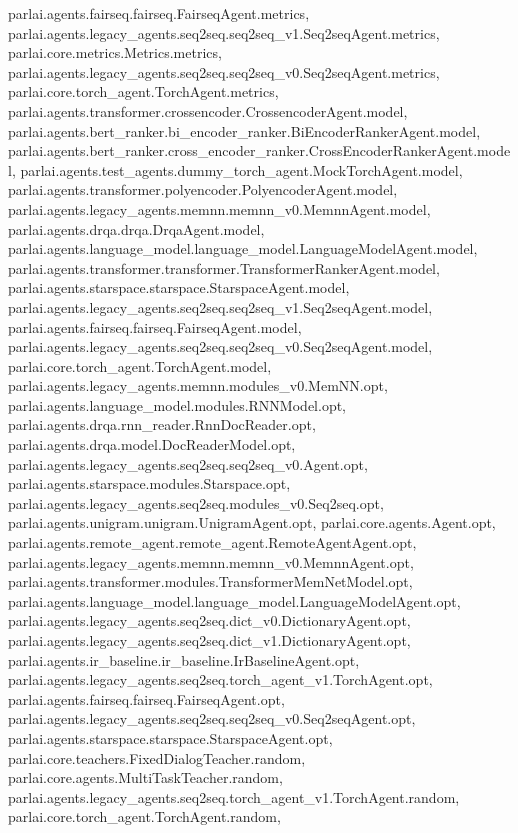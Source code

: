 parlai.\+agents.\+fairseq.\+fairseq.\+Fairseq\+Agent.\+metrics, parlai.\+agents.\+legacy\+\_\+agents.\+seq2seq.\+seq2seq\+\_\+v1.\+Seq2seq\+Agent.\+metrics, parlai.\+core.\+metrics.\+Metrics.\+metrics, parlai.\+agents.\+legacy\+\_\+agents.\+seq2seq.\+seq2seq\+\_\+v0.\+Seq2seq\+Agent.\+metrics, parlai.\+core.\+torch\+\_\+agent.\+Torch\+Agent.\+metrics, parlai.\+agents.\+transformer.\+crossencoder.\+Crossencoder\+Agent.\+model, parlai.\+agents.\+bert\+\_\+ranker.\+bi\+\_\+encoder\+\_\+ranker.\+Bi\+Encoder\+Ranker\+Agent.\+model, parlai.\+agents.\+bert\+\_\+ranker.\+cross\+\_\+encoder\+\_\+ranker.\+Cross\+Encoder\+Ranker\+Agent.\+model, parlai.\+agents.\+test\+\_\+agents.\+dummy\+\_\+torch\+\_\+agent.\+Mock\+Torch\+Agent.\+model, parlai.\+agents.\+transformer.\+polyencoder.\+Polyencoder\+Agent.\+model, parlai.\+agents.\+legacy\+\_\+agents.\+memnn.\+memnn\+\_\+v0.\+Memnn\+Agent.\+model, parlai.\+agents.\+drqa.\+drqa.\+Drqa\+Agent.\+model, parlai.\+agents.\+language\+\_\+model.\+language\+\_\+model.\+Language\+Model\+Agent.\+model, parlai.\+agents.\+transformer.\+transformer.\+Transformer\+Ranker\+Agent.\+model, parlai.\+agents.\+starspace.\+starspace.\+Starspace\+Agent.\+model, parlai.\+agents.\+legacy\+\_\+agents.\+seq2seq.\+seq2seq\+\_\+v1.\+Seq2seq\+Agent.\+model, parlai.\+agents.\+fairseq.\+fairseq.\+Fairseq\+Agent.\+model, parlai.\+agents.\+legacy\+\_\+agents.\+seq2seq.\+seq2seq\+\_\+v0.\+Seq2seq\+Agent.\+model, parlai.\+core.\+torch\+\_\+agent.\+Torch\+Agent.\+model, parlai.\+agents.\+legacy\+\_\+agents.\+memnn.\+modules\+\_\+v0.\+Mem\+N\+N.\+opt, parlai.\+agents.\+language\+\_\+model.\+modules.\+R\+N\+N\+Model.\+opt, parlai.\+agents.\+drqa.\+rnn\+\_\+reader.\+Rnn\+Doc\+Reader.\+opt, parlai.\+agents.\+drqa.\+model.\+Doc\+Reader\+Model.\+opt, parlai.\+agents.\+legacy\+\_\+agents.\+seq2seq.\+seq2seq\+\_\+v0.\+Agent.\+opt, parlai.\+agents.\+starspace.\+modules.\+Starspace.\+opt, parlai.\+agents.\+legacy\+\_\+agents.\+seq2seq.\+modules\+\_\+v0.\+Seq2seq.\+opt, parlai.\+agents.\+unigram.\+unigram.\+Unigram\+Agent.\+opt, parlai.\+core.\+agents.\+Agent.\+opt, parlai.\+agents.\+remote\+\_\+agent.\+remote\+\_\+agent.\+Remote\+Agent\+Agent.\+opt, parlai.\+agents.\+legacy\+\_\+agents.\+memnn.\+memnn\+\_\+v0.\+Memnn\+Agent.\+opt, parlai.\+agents.\+transformer.\+modules.\+Transformer\+Mem\+Net\+Model.\+opt, parlai.\+agents.\+language\+\_\+model.\+language\+\_\+model.\+Language\+Model\+Agent.\+opt, parlai.\+agents.\+legacy\+\_\+agents.\+seq2seq.\+dict\+\_\+v0.\+Dictionary\+Agent.\+opt, parlai.\+agents.\+legacy\+\_\+agents.\+seq2seq.\+dict\+\_\+v1.\+Dictionary\+Agent.\+opt, parlai.\+agents.\+ir\+\_\+baseline.\+ir\+\_\+baseline.\+Ir\+Baseline\+Agent.\+opt, parlai.\+agents.\+legacy\+\_\+agents.\+seq2seq.\+torch\+\_\+agent\+\_\+v1.\+Torch\+Agent.\+opt, parlai.\+agents.\+fairseq.\+fairseq.\+Fairseq\+Agent.\+opt, parlai.\+agents.\+legacy\+\_\+agents.\+seq2seq.\+seq2seq\+\_\+v0.\+Seq2seq\+Agent.\+opt, parlai.\+agents.\+starspace.\+starspace.\+Starspace\+Agent.\+opt, parlai.\+core.\+teachers.\+Fixed\+Dialog\+Teacher.\+random, parlai.\+core.\+agents.\+Multi\+Task\+Teacher.\+random, parlai.\+agents.\+legacy\+\_\+agents.\+seq2seq.\+torch\+\_\+agent\+\_\+v1.\+Torch\+Agent.\+random, parlai.\+core.\+torch\+\_\+agent.\+Torch\+Agent.\+random, 